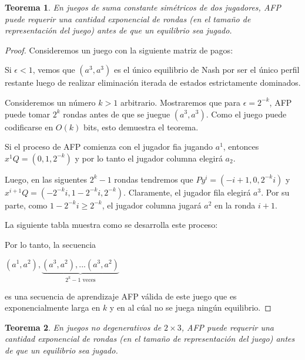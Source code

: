\documentclass{article}
\newtheorem{theorem}{Teorema}
\begin{document}
\begin{theorem}
    En juegos de suma constante simétricos de dos jugadores, AFP puede requerir una cantidad exponencial de rondas
    (en el tamaño de representación del juego) antes de que un equilibrio sea jugado.
\end{theorem}

\begin{proof}
    Consideremos un juego con la siguiente matriz de pagos:

    

    Si $\epsilon < 1$, vemos que $(a^3, a^3)$ es el único
    equilibrio de Nash por ser el único perfil restante luego de realizar eliminación iterada de estados estrictamente dominados.

    Consideremos un número $k > 1$ arbitrario. Mostraremos que para $\epsilon = 2^{-k}$, AFP puede tomar $2^k$ rondas antes de que
    se juegue $(a^3, a^3)$. Como el juego puede codificarse en $O(k)$ bits, esto demuestra el teorema.

    Si el proceso de AFP comienza con el jugador fia jugando $a^1$, entonces $x^1Q = (0, 1, 2^{-k})$ y por lo tanto
    el jugador columna elegirá $a_2$.

    Luego, en las siguentes $2^k - 1$ rondas tendremos que $Py^i = (-i + 1, 0, 2^{-k}i)$ y $x^{i+1}Q = (-2^{-k}i, 1 - 2^{-k}i, 2^{-k})$.
    Claramente, el jugador fila elegirá $a^3$.
    Por su parte, como $1 - 2^{-k}i \ge 2^{-k}$, el jugador columna jugará $a^2$ en la ronda $i + 1$.

    La siguiente tabla muestra como se desarrolla este proceso:

    

    Por lo tanto, la secuencia

    \begin{center}
    \begin{math}
        (a^1, a^2), \underbrace{(a^3, a^2), ... (a^3, a^2)}_{\text{$2^k - 1$ veces}}
    \end{math}
    \end{center}

    es una secuencia de aprendizaje AFP válida de este juego que es exponencialmente larga en $k$ y en al cúal no se juega ningún equilibrio.
\end{proof}

\begin{theorem}
    En juegos no degenerativos de $2 \times 3$, AFP puede requerir una cantidad exponencial de rondas
    (en el tamaño de representación del juego) antes de que un equilibrio sea jugado.
\end{theorem}
\end{document}
